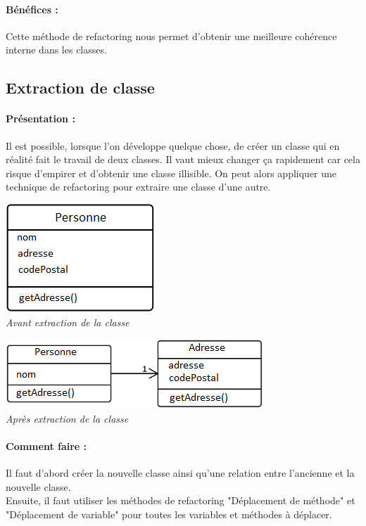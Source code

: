 \documentclass[a4paper,twoside,12pt,openright]{report}
\begin{document}
\paragraph{Bénéfices :}
Cette méthode de refactoring nous permet d'obtenir une meilleure cohérence interne dans les classes.\\

\subsection{Extraction de classe}
\paragraph{Présentation :}
Il est possible, lorsque l'on développe quelque chose, de créer un classe qui en réalité fait le travail de deux classes. Il vaut mieux changer ça rapidement car cela risque d'empirer et d'obtenir une classe illisible. On peut alors appliquer une technique de refactoring pour extraire une classe d'une autre.

\begin{center}
\includegraphics[scale=1]{Image/Extraction_Classe.png}\\
\itshape{Avant extraction de la classe}
\end{center}

\begin{center}
\includegraphics[scale=1]{Image/Extraction_Classe2.png}\\
\itshape{Après extraction de la classe}
\end{center}

\paragraph{Comment faire :}
Il faut d'abord créer la nouvelle classe ainsi qu'une relation entre l'ancienne et la nouvelle classe.\\
Ensuite, il faut utiliser les méthodes de refactoring "Déplacement de méthode" et "Déplacement de variable" pour toutes les variables et méthodes à déplacer.
\end{document}
